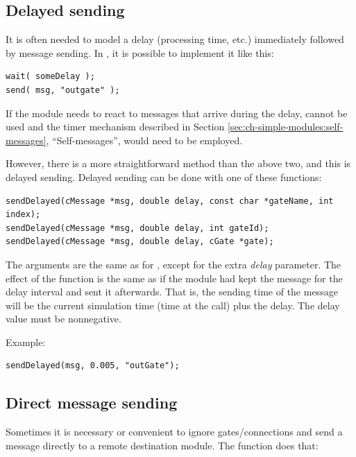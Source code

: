 \subsection{Delayed sending}

It is often needed to model a delay (processing time, etc.) immediately
followed by message sending. In {\opp}, it is possible to implement
it like this:

\begin{verbatim}
wait( someDelay );
send( msg, "outgate" );
\end{verbatim}


If the module needs to react to messages that arrive during the delay,
 cannot be used and the timer mechanism described in
Section \ref{sec:ch-simple-modules:self-messages}, ``Self-messages'', would
need to be employed.


However, there is a more straightforward method than the above two,
and this is delayed sending. Delayed sending
can be done with one of these functions:

\begin{verbatim}
sendDelayed(cMessage *msg, double delay, const char *gateName, int index);
sendDelayed(cMessage *msg, double delay, int gateId);
sendDelayed(cMessage *msg, double delay, cGate *gate);
\end{verbatim}

The arguments are the same as for , except for the extra \textit{delay}
parameter. The effect of the function is the same as if the module
had kept the message for the delay interval and sent it afterwards.
That is, the sending time of the message will be the current
simulation time (time at the  call) plus the delay.
The delay value must be nonnegative.

Example:

\begin{verbatim}
sendDelayed(msg, 0.005, "outGate");
\end{verbatim}



\subsection{Direct message sending}

Sometimes it is necessary or convenient to ignore gates/connections
and send a message directly to a remote destination module. The 
function does that:

